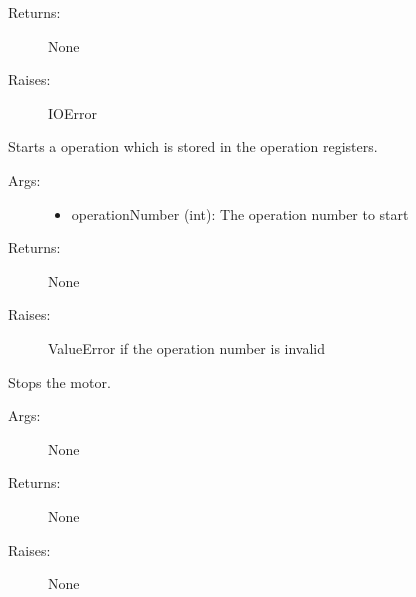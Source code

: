 \documentclass[letterpaper,10pt,english]{sphinxmanual}
\begin{document}
\begin{fulllineitems}
\begin{fulllineitems}
\begin{description}
\begin{itemize}
\end{itemize}

\item[{Returns:}] \leavevmode
None

\item[{Raises:}] \leavevmode
IOError

\end{description}

\end{fulllineitems}


\begin{fulllineitems}
\label{stepperMotor:stepperMotor.StepperMotor.startOperation}
Starts a operation which is stored in the operation registers.
\begin{description}
\item[{Args:}] \leavevmode\begin{itemize}
\item {} 
operationNumber (int): The operation number to start

\end{itemize}

\item[{Returns:}] \leavevmode
None

\item[{Raises:}] \leavevmode
ValueError if the operation number is invalid

\end{description}

\end{fulllineitems}


\begin{fulllineitems}
\label{stepperMotor:stepperMotor.StepperMotor.stopMoving}
Stops the motor.
\begin{description}
\item[{Args:}] \leavevmode
None

\item[{Returns:}] \leavevmode
None

\item[{Raises:}] \leavevmode
None

\end{description}


\end{fulllineitems}
\end{fulllineitems}
\end{document}
